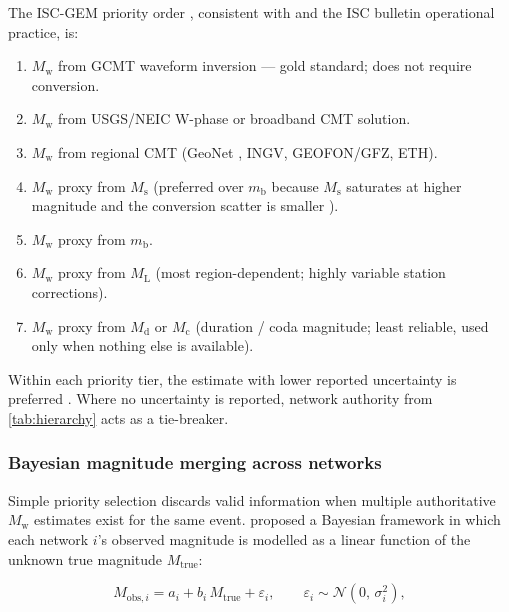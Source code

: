 \documentclass[12pt]{article}
\begin{document}
The ISC-GEM priority order \citep{ISCGEM2018}, consistent with
\citet{Grunthal2016} and the ISC bulletin operational practice, is:

\begin{enumerate}
  \item $M_\mathrm{w}$ from GCMT waveform inversion \citep{Dziewonski1981,
        Ekstrom2012} — gold standard; does not require conversion.
  \item $M_\mathrm{w}$ from USGS/NEIC W-phase or broadband CMT solution.
  \item $M_\mathrm{w}$ from regional CMT (GeoNet \citep{GeoNetEqCatalogue},
        INGV, GEOFON/GFZ, ETH).
  \item $M_\mathrm{w}$ proxy from $M_\mathrm{s}$ (preferred over $m_\mathrm{b}$
        because $M_\mathrm{s}$ saturates at higher magnitude and the conversion
        scatter is smaller \citep{Bormann2012}).
  \item $M_\mathrm{w}$ proxy from $m_\mathrm{b}$.
  \item $M_\mathrm{w}$ proxy from $M_\mathrm{L}$ (most region-dependent;
        highly variable station corrections).
  \item $M_\mathrm{w}$ proxy from $M_\mathrm{d}$ or $M_\mathrm{c}$ (duration /
        coda magnitude; least reliable, used only when nothing else is
        available).
\end{enumerate}

Within each priority tier, the estimate with lower reported uncertainty is
preferred \citep{ISCGEM2018}.  Where no uncertainty is reported, network
authority from \cref{tab:hierarchy} acts as a tie-breaker.

\subsubsection{Bayesian magnitude merging across networks}

Simple priority selection discards valid information when multiple authoritative
$M_\mathrm{w}$ estimates exist for the same event.
\citet{Si2024} proposed a Bayesian framework in which each network $i$'s
observed magnitude is modelled as a linear function of the unknown true magnitude
$M_\mathrm{true}$:

\begin{equation}
  M_{\mathrm{obs},i} = a_i + b_i\,M_{\mathrm{true}} + \varepsilon_i,
  \qquad \varepsilon_i \sim \mathcal{N}(0,\,\sigma_i^2),
  \label{eq:bayesmag}
\end{equation}
\end{document}
